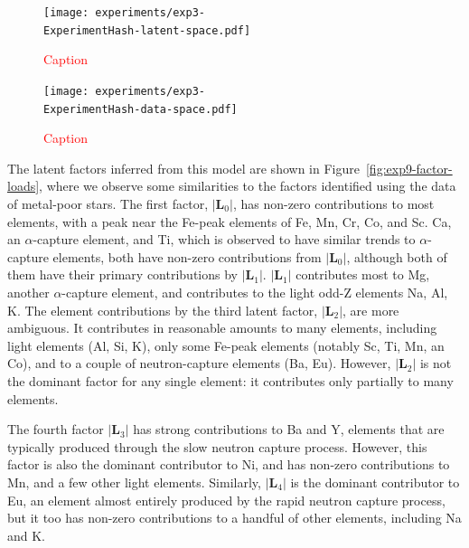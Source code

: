 \documentclass[twocolumn]{aastex62}
\newcommand{\todo}[1]{\textcolor{red}{#1}}
\newcommand{\ExperimentHash}{96ff8}
\begin{document}
\begin{figure}
	\texttt{[image: experiments/exp3-\\ExperimentHash-latent-space.pdf]}
	\caption{\todo{Caption}}
    \label{fig:exp3-latent-space}
\end{figure}




\begin{figure}
	\texttt{[image: experiments/exp3-\\ExperimentHash-data-space.pdf]}
	\caption{\todo{Caption}}
    \label{fig:exp3-data-space}
\end{figure}


The latent factors inferred from this model are shown in Figure~\ref{fig:exp9-factor-loads},
where we observe some similarities to the factors identified using the \citet{Barklem:2005}
data of metal-poor stars. The first factor, $|\mathbf{L}_0|$, has non-zero contributions
to most elements, with a peak near the Fe-peak elements of Fe, Mn, Cr, Co, and Sc. 
Ca, an $\alpha$-capture element, and Ti, which is observed to have similar trends to
$\alpha$-capture elements, both have non-zero contributions from $|\mathbf{L}_0|$,
although both of them have their primary contributions by $|\mathbf{L}_1|$. $|\mathbf{L}_1|$
contributes most to Mg, another $\alpha$-capture element, and contributes to the light
odd-Z elements Na, Al, K. 
The element contributions by the third latent factor, $|\mathbf{L}_2|$, are more ambiguous.
It contributes in reasonable amounts to many elements, including light elements (Al, Si, K),
only some Fe-peak elements (notably Sc, Ti, Mn, an Co), and to a couple of neutron-capture
elements (Ba, Eu). However, $|\mathbf{L}_2|$ is not the dominant factor for any single element:
it contributes only partially to many elements.

The fourth factor $|\mathbf{L}_3|$ has strong contributions to Ba and Y, elements that are
typically produced through the slow neutron capture process. However, this factor is also
the dominant contributor to Ni, and has non-zero contributions to Mn, and a few other light
elements. Similarly, $|\mathbf{L}_4|$ is the dominant contributor to Eu, an
element almost entirely produced by the rapid neutron capture process, but it too has
non-zero contributions to a handful of other elements, including Na and K.

\end{document}
